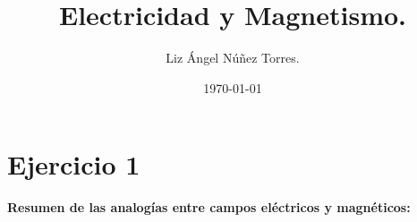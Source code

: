 \documentclass[a4paper,12pt]{article} %
\title{Electricidad y Magnetismo.}
\author{Liz Ángel Núñez Torres.}
\date{\today}
\begin{document}
\maketitle 

\section*{Ejercicio 1} %


\vspace{\baselineskip}


\begin{justify}
\textbf{Resumen de las analogías entre campos eléctricos y magnéticos:}
\end{justify}

\vspace{\baselineskip}
\end{document}
